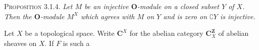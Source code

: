 \indent\textsc{Proposition 3.1.4.} \textit{Let $M$ be an injective
$\mathbf O$-module on a closed subset $Y$ of $X$. Then the $\mathbf O$-module
$M^X$ which agrees with $M$ on $Y$ and is zero on $\complement Y$ is injective.}

 Let $X$ be a topological space.
Write $\mathbf C^X$ for the abelian category $\mathbf C^{\mathbf Z}_X$ of abelian sheaves on
$X$. If $F$ is such a


